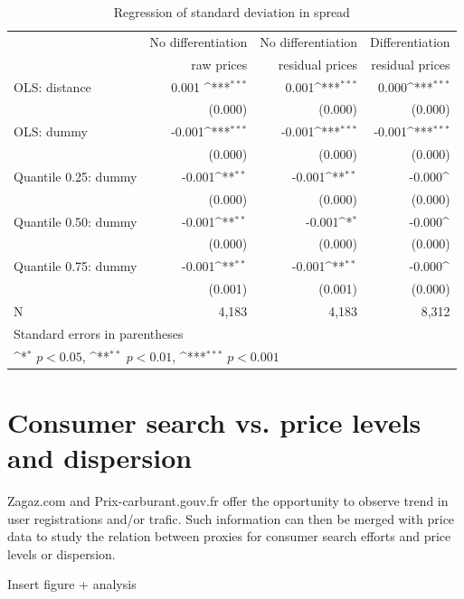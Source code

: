 \documentclass[11pt]{article}
\begin{document}
\begin{table}[H]\centering
\def\sym#1{\ifmmode^{#1}\else\(^{#1}\)\fi}
\caption{Regression of standard deviation in spread}
\begin{tabular}{lrrr}
\hline
\hline
{} & No differentiation & No differentiation & Differentiation \\
{} & raw prices & residual prices & residual prices \\
\hline
OLS: distance &  0.001 \sym{***}&      0.001\sym{***}&       0.000\sym{***}\\
{} &     (0.000)         &     (0.000)         &     (0.000)   \\
OLS: dummy &  -0.001\sym{***}&      -0.001\sym{***}&     -0.001\sym{***}\\
{} &    (0.000)     &     (0.000)         &     (0.000) \\
Quantile 0.25: dummy     &       -0.001\sym{**}&       -0.001\sym{**}&       -0.000\sym{}\\
{} &     (0.000)       &     (0.000)         &     (0.000)  \\
Quantile 0.50: dummy     &       -0.001\sym{**}&      -0.001\sym{*}&       -0.000\sym{}\\
{} &  (0.000)         &     (0.000)         &     (0.000)    \\
Quantile 0.75: dummy     &       -0.001\sym{**}&     -0.001\sym{**}&       -0.000\sym{}\\
{} &     (0.001)         &     (0.001)         &     (0.000)   \\
\hline
N      &     4,183         &     4,183      &     8,312    \\
\hline\hline
\multicolumn{4}{l}{\footnotesize Standard errors in parentheses}\\
\multicolumn{4}{l}{\footnotesize \sym{*} \(p<0.05\), \sym{**} \(p<0.01\), \sym{***} \(p<0.001\)}\\
\end{tabular}
\end{table}

\section{Consumer search vs. price levels and dispersion}

Zagaz.com and Prix-carburant.gouv.fr offer the opportunity to observe trend in user registrations and/or trafic. Such information can then be merged with price data to study the relation between proxies for consumer search efforts and price levels or dispersion.

Insert figure + analysis
\end{document}
